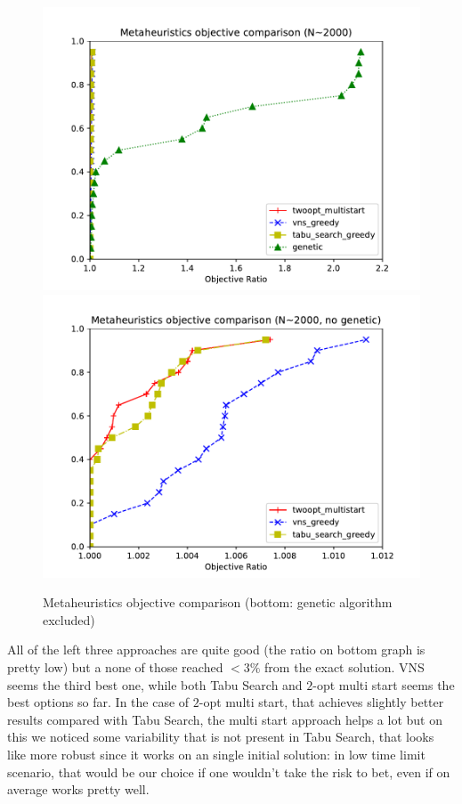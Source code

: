 \newpage
\begin{figure}[h!]
    \centering
        \includegraphics[width=0.8\linewidth]{figures/meta_results.pdf}
        \includegraphics[width=0.8\linewidth]{figures/meta_results_wogenetic.pdf}
        \caption[Metaheuristics objective comparison]{Metaheuristics objective comparison (bottom: genetic algorithm excluded)}
\end{figure}


All of the left three approaches are quite good (the ratio on bottom graph is
pretty low) but a none of those reached $<3\%$ from the exact solution. VNS seems the
third best one, while both Tabu Search and $2$-opt multi start seems the best
options so far. In the case of $2$-opt multi start, that achieves slightly better
results compared with Tabu Search, the multi start approach helps a lot but on
this we noticed some variability that is not present in Tabu Search, that looks
like more robust since it works on an single initial solution: in low time limit
scenario, that would be our choice if one wouldn't take the risk to bet, even if
on average works pretty well.\\

